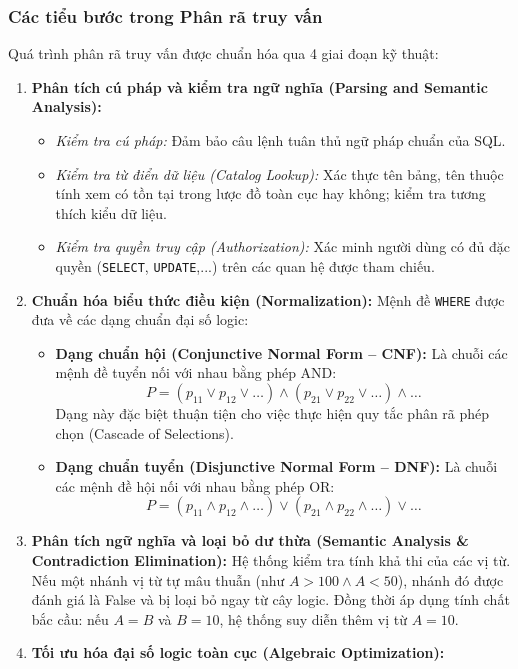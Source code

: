 \documentclass[12pt,a4paper]{report}
\begin{document}
\subsubsection{Các tiểu bước trong Phân rã truy vấn}
Quá trình phân rã truy vấn được chuẩn hóa qua 4 giai đoạn kỹ thuật:
\begin{enumerate}[leftmargin=0.8cm, topsep=2pt, itemsep=2pt]
    \item \textbf{Phân tích cú pháp và kiểm tra ngữ nghĩa (Parsing and Semantic Analysis):}
    \begin{itemize}
        \item \textit{Kiểm tra cú pháp:} Đảm bảo câu lệnh tuân thủ ngữ pháp chuẩn của SQL.
        \item \textit{Kiểm tra từ điển dữ liệu (Catalog Lookup):} Xác thực tên bảng, tên thuộc tính xem có tồn tại trong lược đồ toàn cục hay không; kiểm tra tương thích kiểu dữ liệu.
        \item \textit{Kiểm tra quyền truy cập (Authorization):} Xác minh người dùng có đủ đặc quyền (\texttt{SELECT}, \texttt{UPDATE},...) trên các quan hệ được tham chiếu.
    \end{itemize}
    \item \textbf{Chuẩn hóa biểu thức điều kiện (Normalization):}
    Mệnh đề \texttt{WHERE} được đưa về các dạng chuẩn đại số logic:
    \begin{itemize}
        \item \textbf{Dạng chuẩn hội (Conjunctive Normal Form -- CNF):} Là chuỗi các mệnh đề tuyển nối với nhau bằng phép AND:
        \[P = (p_{11} \vee p_{12} \vee \dots) \wedge (p_{21} \vee p_{22} \vee \dots) \wedge \dots\]
        Dạng này đặc biệt thuận tiện cho việc thực hiện quy tắc phân rã phép chọn (Cascade of Selections).
        \item \textbf{Dạng chuẩn tuyển (Disjunctive Normal Form -- DNF):} Là chuỗi các mệnh đề hội nối với nhau bằng phép OR:
        \[P = (p_{11} \wedge p_{12} \wedge \dots) \vee (p_{21} \wedge p_{22} \wedge \dots) \vee \dots\]
    \end{itemize}
    \item \textbf{Phân tích ngữ nghĩa và loại bỏ dư thừa (Semantic Analysis \& Contradiction Elimination):}
    Hệ thống kiểm tra tính khả thi của các vị từ. Nếu một nhánh vị từ tự mâu thuẫn (như $A > 100 \wedge A < 50$), nhánh đó được đánh giá là False và bị loại bỏ ngay từ cây logic. Đồng thời áp dụng tính chất bắc cầu: nếu $A = B$ và $B = 10$, hệ thống suy diễn thêm vị từ $A = 10$.
    \item \textbf{Tối ưu hóa đại số logic toàn cục (Algebraic Optimization):}

\end{enumerate}
\end{document}
